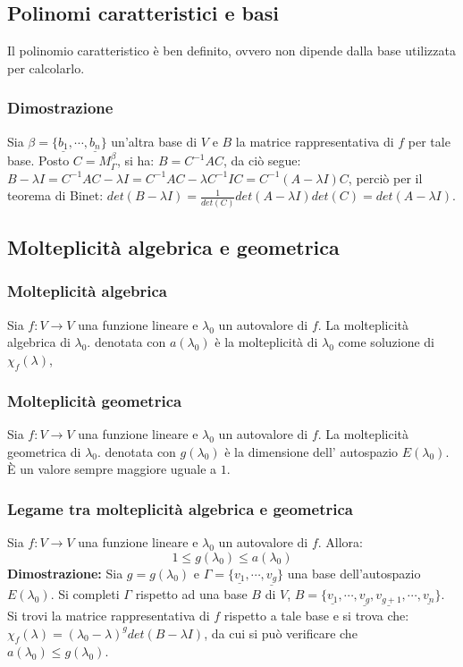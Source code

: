\subsection{Polinomi caratteristici e basi}
Il polinomio caratteristico \`e ben definito, ovvero non dipende dalla base utilizzata per calcolarlo.
\subsubsection{Dimostrazione}
Sia $\beta=\{\underline{b_1},\cdots,\underline{b_n}\}$ un'altra base di $V$ e $B$ la matrice rappresentativa di $f$ per tale base. Posto $C=M_\Gamma^\beta$, si ha: $B=C^{-1}AC$,
da ci\`o segue: $B-\lambda I=C^{-1}AC-\lambda I=C^{-1}AC-\lambda C^{-1}IC=C^{-1}(A-\lambda I)C$, perci\`o per il teorema di Binet: $det(B-\lambda I)=\frac{1}{det(C)}det(A-\lambda 
I)det(C)=det(A-\lambda I)$.
\subsection{Molteplicit\`a algebrica e geometrica}
\subsubsection{Molteplicit\`a algebrica}
Sia $f:V\rightarrow V$ una funzione lineare e $\lambda_0$ un autovalore di $f$. La molteplicit\`a algebrica di $\lambda_0$. denotata con $a(\lambda_0)$ \`e la molteplicit\`a di 
$\lambda_0$ come soluzione di $\chi_f(\lambda)$,
\subsubsection{Molteplicit\`a geometrica}
Sia $f:V\rightarrow V$ una funzione lineare e $\lambda_0$ un autovalore di $f$. La molteplicit\`a geometrica di $\lambda_0$. denotata con $g(\lambda_0)$ \`e la dimensione dell'
autospazio $E(\lambda_0)$. \`E un valore sempre maggiore uguale a $1$.
\subsubsection{Legame tra molteplicit\`a algebrica e geometrica}
Sia $f:V\rightarrow V$ una funzione lineare e $\lambda_0$ un autovalore di $f$. Allora:
\begin{equation}
1\le g(\lambda_0)\le a(\lambda_0)
\end{equation}
\textbf{Dimostrazione:}
Sia $g=g(\lambda_0)$ e $\Gamma=\{\underline{v_1},\cdots,\underline{v_g}\}$ una base dell'autospazio $E(\lambda_0)$. Si completi $\Gamma$ rispetto ad una base $B$ di $V$, $B=\{
\underline{v_1},\cdots,\underline{v_g},\underline{v_{g+1}},\cdots,\underline{v_n}\}$. Si trovi la matrice rappresentativa di $f$ rispetto a tale base e si trova che: 
$\chi_f(\lambda)=(\lambda_0-\lambda)^gdet(B-\lambda I)$, da cui si pu\`o verificare che $a(\lambda_0)\le g(\lambda_0)$.
